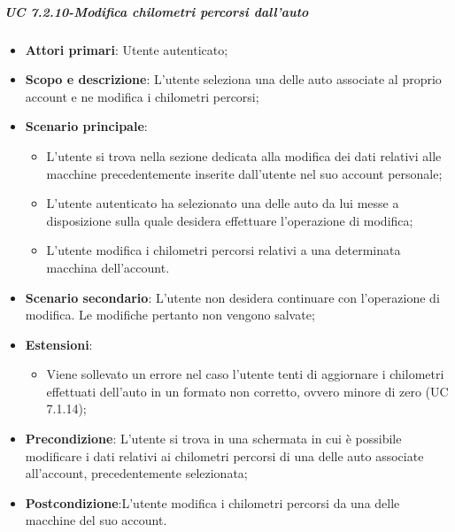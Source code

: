             \subparagraph{UC 7.2.10-Modifica chilometri percorsi dall'auto}
            \begin{itemize}
                \item \textbf{Attori primari}: Utente autenticato;
              
                \item \textbf{Scopo e descrizione}: L'utente seleziona una delle auto associate al proprio account e ne modifica i chilometri percorsi; 
                \item \textbf{Scenario principale}:
                    \begin{itemize}
                        \item L'utente si trova nella sezione dedicata alla modifica dei dati relativi alle macchine precedentemente inserite dall'utente nel suo account personale;
                        \item L'utente autenticato ha selezionato una delle auto da lui messe a disposizione sulla quale desidera effettuare l'operazione di modifica;
                        \item L'utente modifica i chilometri percorsi relativi a una determinata macchina dell'account.
                    \end{itemize}
                \item \textbf{Scenario secondario}: L'utente non desidera continuare con l'operazione di modifica. Le modifiche pertanto non vengono salvate;
                \item \textbf{Estensioni}:
                    \begin{itemize}
                        \item Viene sollevato un errore nel caso l'utente tenti di aggiornare i chilometri effettuati dell'auto in un formato non corretto, ovvero minore di zero (UC 7.1.14); 
                    \end{itemize}
                \item \textbf{Precondizione}: L'utente si trova in una schermata in cui è possibile modificare i dati relativi ai chilometri percorsi di una delle auto associate all'account, precedentemente selezionata;
                \item \textbf{Postcondizione}:L'utente modifica i chilometri percorsi da una delle macchine del suo account.
            \end{itemize}
            
